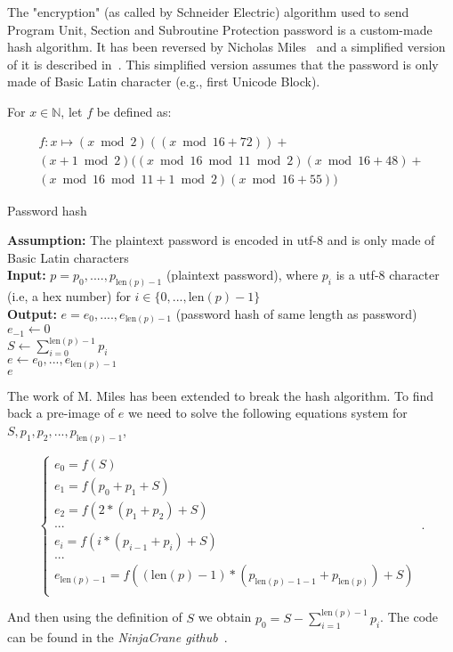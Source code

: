 
The "encryption" (as called by Schneider Electric) algorithm used to send Program Unit, Section and Subroutine Protection password is a custom-made hash algorithm. It has been reversed by Nicholas Miles~\cite{modipwn} and a simplified version of it is described in~. This simplified version assumes that the password is only made of Basic Latin character (e.g., first Unicode Block).

For $x \in \mathbb{N}$, let $f$ be defined as:

\begin{multline}
    \label{equ:define-f}
    f:x\mapsto (x \bmod{2})((x \bmod{16} + 72)) + \\ (x + 1 \bmod{2})((x\bmod{16}\bmod{11}\bmod{2})(x\bmod{16}+48) + \\ (x\bmod{16}\bmod{11} + 1 \bmod{2})(x\bmod{16} + 55))
\end{multline}

\begin{algorithm}[H]
\caption{Password hash}
\label{algo:pwd-hash}
\hspace*{0pt} \textbf{Assumption:} The plaintext password is encoded in utf-8 and is only made of Basic Latin characters \\
\hspace*{0pt} \textbf{Input:} $p = p_0,....,p_{\textrm{len}(p)-1}$ (plaintext password), where $p_i$ is a utf-8 character (i.e, a hex number) for $i \in \{0, ..., \textrm{len}(p)-1\}$\\ 
\hspace*{0pt} \textbf{Output:} $e = e_0,....,e_{\textrm{len}(p)-1}$ (password hash of same length as password) \\ 
$e_{-1} \gets 0$ \\
$S \gets \sum_{i=0}^{\textrm{len}(p)-1}p_i$ \\
$e \gets e_0, ..., e_{\textrm{len}(p)-1}$ \\
\Return $e$
\end{algorithm}

The work of M. Miles has been extended to break the hash algorithm. To find back a pre-image of $e$ we need to solve the following equations system for $S, p_1, p_2, ..., p_{\textrm{len}(p)-1}$,

\begin{equation}
    \begin{cases}
      e_0 = f(S)\\
      e_1 = f(p_0 + p_1 + S)\\
      e_2 = f(2*(p_1 + p_2) + S)\\
      ... \\
      e_i = f(i*(p_{i-1} + p_i) + S)\\
      ... \\
      e_{\textrm{len}(p)-1}= f((\textrm{len}(p)-1)*(p_{\textrm{len}(p)-1-1}+ p_{\textrm{len}(p)}) + S)\\
    \end{cases}\,.
\end{equation}

And then using the definition of $S$ we obtain $p_0 = S - \sum_{i=1}^{\textrm{len}(p)-1}p_i$. The code can be found in the \emph{NinjaCrane github}~\cite{MyGithub}. 
